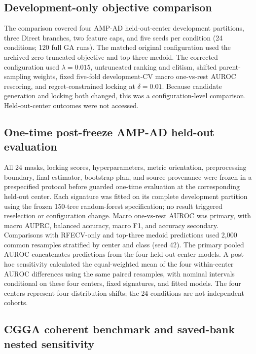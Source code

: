 \subsection{Development-only objective comparison}

The comparison covered four AMP-AD held-out-center development partitions, three Direct branches, two feature caps, and five seeds per condition (24 conditions; 120 full GA runs). The matched original configuration used the archived zero-truncated objective and top-three medoid. The corrected configuration used \(\lambda=0.015\), untruncated ranking and elitism, shifted parent-sampling weights, fixed five-fold development-CV macro one-vs-rest AUROC rescoring, and regret-constrained locking at \(\delta=0.01\). Because candidate generation and locking both changed, this was a configuration-level comparison. Held-out-center outcomes were not accessed.

\subsection{One-time post-freeze AMP-AD held-out evaluation}

All 24 masks, locking scores, hyperparameters, metric orientation, preprocessing boundary, final estimator, bootstrap plan, and source provenance were frozen in a prespecified protocol before guarded one-time evaluation at the corresponding held-out center. Each signature was fitted on its complete development partition using the frozen 150-tree random-forest specification; no result triggered reselection or configuration change. Macro one-vs-rest AUROC was primary, with macro AUPRC, balanced accuracy, macro F1, and accuracy secondary. Comparisons with RFECV-only and top-three medoid predictions used 2,000 common resamples stratified by center and class (seed 42). The primary pooled AUROC concatenates predictions from the four held-out-center models. A post hoc sensitivity calculated the equal-weighted mean of the four within-center AUROC differences using the same paired resamples, with nominal intervals conditional on these four centers, fixed signatures, and fitted models. The four centers represent four distribution shifts; the 24 conditions are not independent cohorts.

\subsection{CGGA coherent benchmark and saved-bank nested sensitivity}

